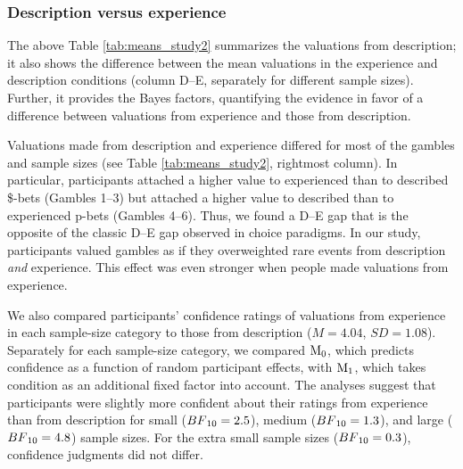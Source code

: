 \documentclass[a4paper, man, floatsintext]{apa6}
\begin{document}
\subsubsection{Description versus experience}

The above Table \ref{tab:means_study2} summarizes the valuations from
description; it also shows the difference between the mean valuations in
the experience and description conditions (column D--E, separately for
different sample sizes). Further, it provides the Bayes factors,
quantifying the evidence in favor of a difference between valuations
from experience and those from description.

Valuations made from description and experience differed for most of the
gambles and sample sizes (see Table \ref{tab:means_study2}, rightmost
column). In particular, participants attached a higher value to
experienced than to described \$-bets (Gambles 1--3) but attached a
higher value to described than to experienced p-bets (Gambles 4--6).
Thus, we found a D--E gap that is the opposite of the classic D--E gap
observed in choice paradigms. In our study, participants valued gambles
as if they overweighted rare events from description \textit{and}
experience. This effect was even stronger when people made valuations
from experience.

We also compared participants' confidence ratings of valuations from
experience in each sample-size category to those from description
(\(M = 4.04\), \(SD = 1.08\)). Separately for each sample-size category,
we compared \(\mathrm{M}\textsubscript{0}\), which predicts confidence
as a function of random participant effects, with
\(\mathrm{M}\textsubscript{1}\), which takes condition as an additional
fixed factor into account. The analyses suggest that participants were
slightly more confident about their ratings from experience than from
description for small (\(BF\textsubscript{10} = 2.5\)), medium
(\(BF\textsubscript{10} = 1.3\)), and large
(\(BF\textsubscript{10} = 4.8\)) sample sizes. For the extra small
sample sizes (\(BF\textsubscript{10} = 0.3\)), confidence judgments did
not differ.
\end{document}
